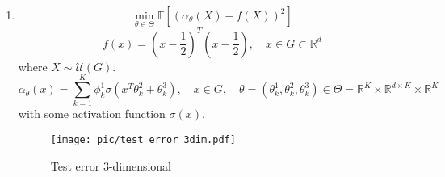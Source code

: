 \documentclass[a4paper,11pt]{scrartcl}
\newcommand*{\R}{\mathbb{R}}
\newcommand*{\EV}[1]{\mathbb{E}\left[{#1}\right]}
\begin{document}
\begin{enumerate}
\begin{enumerate}[leftmargin=1em]
    \item
     \[\min_{\theta\in\Theta} \EV{\left( \alpha_\theta(X) - f(X) \right)^2}\]
     \[f(x) = \left(x-\frac{1}{2}\right)^T\left(x-\frac{1}{2}\right), \quad
      x \in G \subset \R^d\]
      where $X \sim \mathcal{U}(G)$.
      \[\alpha_\theta(x) = \sum^K_{k=1}\phi_k^1\sigma\left( x^T \theta^2_k +
          \theta^3_k \right), \quad x \in G, \quad
        \theta = \left(\theta^1_k, \theta^2_k, \theta^3_k\right) \in \Theta = \R^K \times
        \R^{d\times K} \times \R^K\]
      with some activation function $\sigma(x)$.

    \begin{figure}[h]
      \centering
      \texttt{[image: pic/test\_error\_3dim.pdf]}
      \caption{Test error 3-dimensional}
      \label{fig:multidim}
    \end{figure}
\end{enumerate}

\end{enumerate}
\end{document}
